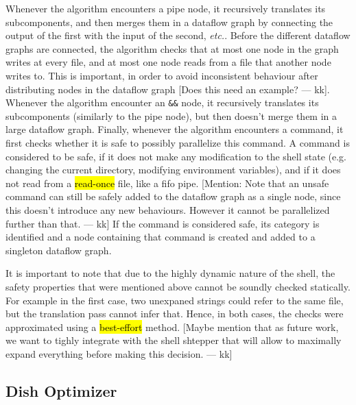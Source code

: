 \documentclass[sigplan,10pt,review,anonymous]{acmart}
\newcommand{\etc}{{\em etc.}\xspace}
\newcommand{\ttt}[1]{\texttt{\small #1}}
\newcommand{\todo}[1]{\hl{#1}\xspace}
\newcommand{\kk}[1]{[{\color{magenta}#1 --- kk}]}
\begin{document}

Whenever the algorithm encounters a pipe node, it recursively
translates its subcomponents, and then merges them in a dataflow graph
by connecting the output of the first with the input of the second,
\etc. Before the different dataflow graphs are connected, the
algorithm checks that at most one node in the graph writes at every
file, and at most one node reads from a file that another node writes
to. This is important, in order to avoid inconsistent behaviour after
distributing nodes in the dataflow graph \kk{Does this need an
  example?}. Whenever the algorithm encounter an \ttt{\&\&} node,
it recursively translates its subcomponents (similarly to the pipe
node), but then doesn't merge them in a large dataflow graph. Finally,
whenever the algorithm encounters a command, it first checks whether
it is safe to possibly parallelize this command. A command is
considered to be safe, if it does not make any modification to the
shell state (e.g. changing the current directory, modifying
environment variables), and if it does not read from a
\todo{read-once} file, like a fifo pipe. \kk{Mention: Note that an
  unsafe command can still be safely added to the dataflow graph as a
  single node, since this doesn't introduce any new
  behaviours. However it cannot be parallelized further than that.} If
the command is considered safe, its category is identified and a node
containing that command is created and added to a singleton dataflow
graph.

It is important to note that due to the highly dynamic nature of the
shell, the safety properties that were mentioned above cannot be
soundly checked statically. For example in the first case, two
unexpaned strings could refer to the same file, but the translation
pass cannot infer that. Hence, in both cases, the checks were
approximated using a \todo{best-effort} method. \kk{Maybe mention that
  as future work, we want to tighly integrate with the shell shtepper
  that will allow to maximally expand everything before making this
  decision.}



\subsection{Dish Optimizer}
\end{document}
